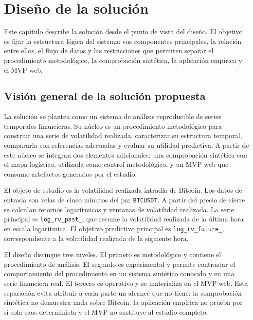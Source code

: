 
\chapter{Diseño de la solución}\label{cap:diseno}

Este capítulo describe la solución desde el punto de vista del diseño. El objetivo es fijar la estructura lógica del sistema: sus componentes principales, la relación entre ellos, el flujo de datos y las restricciones que permiten separar el procedimiento metodológico, la comprobación sintética, la aplicación empírica y el MVP web.

\section{Visión general de la solución propuesta}\label{sec:vision-general}

La solución se plantea como un sistema de análisis reproducible de series temporales financieras. Su núcleo es un procedimiento metodológico para construir una serie de volatilidad realizada, caracterizar su estructura temporal, compararla con referencias adecuadas y evaluar su utilidad predictiva. A partir de este núcleo se integran dos elementos adicionales: una comprobación sintética con el mapa logístico, utilizada como control metodológico, y un MVP web que consume artefactos generados por el estudio.

El objeto de estudio es la volatilidad realizada intradía de Bitcoin. Los datos de entrada son velas de cinco minutos del par \texttt{BTCUSDT}. A partir del precio de cierre se calculan retornos logarítmicos y ventanas de volatilidad realizada. La serie principal es \texttt{log\_\allowbreak rv\_\allowbreak past\_}, que resume la volatilidad realizada de la última hora en escala logarítmica. El objetivo predictivo principal es \texttt{log\_\allowbreak rv\_\allowbreak future\_}, correspondiente a la volatilidad realizada de la siguiente hora.

El diseño distingue tres niveles. El primero es metodológico y contiene el procedimiento de análisis. El segundo es experimental y permite contrastar el comportamiento del procedimiento en un sistema sintético conocido y en una serie financiera real. El tercero es operativo y se materializa en el MVP web. Esta separación evita atribuir a cada parte un alcance que no tiene: la comprobación sintética no demuestra nada sobre Bitcoin, la aplicación empírica no prueba por sí sola caos determinista y el MVP no sustituye al estudio completo.

